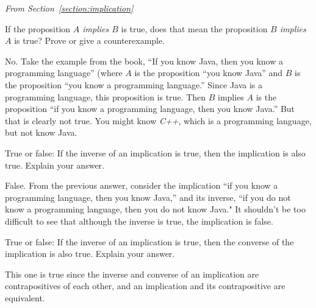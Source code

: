 \medskip

\noindent
{\em From Section~\ref{section:implication}}


\begin{requ}
If the proposition {\em $A$ implies $B$} is true, 
does that mean the proposition {\em $B$ implies $A$} is true?
Prove or give a counterexample. 
\begin{requanswer}
No. 
Take the example from the book, ``If you know Java, then you know a programming language'' (where $A$ is the proposition 
``you know Java'' and $B$ is the proposition ``you know a programming language.''
Since Java is a programming language, this proposition is true.
Then $B$ implies $A$ is the proposition ``if you know a programming language, then you know Java.'' But that is clearly not
true. You might know {\em C++}, which is a programming language, but not know Java.
\end{requanswer}
\end{requ}

\begin{requ}
True or false: If the inverse of an implication is true, then the implication is also true. Explain your answer.
\begin{requanswer}
False. From the previous answer, consider the implication ``if you know a programming language, then you know Java,'' 
and its inverse, ``if you do not know a programming language, then you do not know Java."
It shouldn't be too difficult to see that although the inverse is true, the implication is false.
\end{requanswer}
\end{requ}

\begin{requ}
True or false: If the inverse of an implication is true, then the converse of the implication is also true. Explain your answer.
\begin{requanswer}
This one is true since the inverse and converse of an implication are contrapositives of each other, and an implication 
and its contrapositive are equivalent.
\end{requanswer}
\end{requ}

